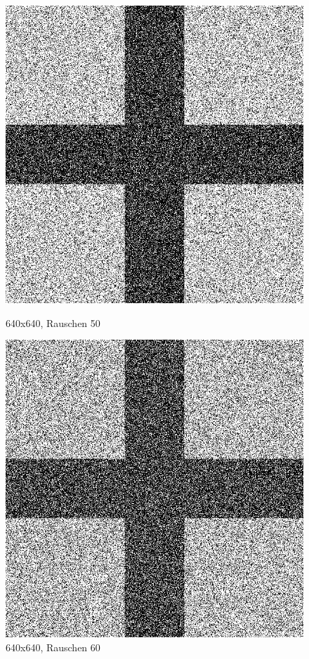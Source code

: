 \begin{figure}[hbt]
	\begin{minipage}{0.5 \textwidth}
		\includegraphics[width=\textwidth]{./Bilder/Auswertung/BeispielBilder/Picture_Crossing_noise_50_pixelCnt_128_featureCnt_5}
		\caption{640x640, Rauschen 50}
	\end{minipage}
	\hfill
	\begin{minipage}{0.5 \textwidth}
		\includegraphics[width=\textwidth]{./Bilder/Auswertung/BeispielBilder/Picture_Crossing_noise_60_pixelCnt_128_featureCnt_5}
		\caption{640x640, Rauschen 60}
	\end{minipage}
\end{figure}

